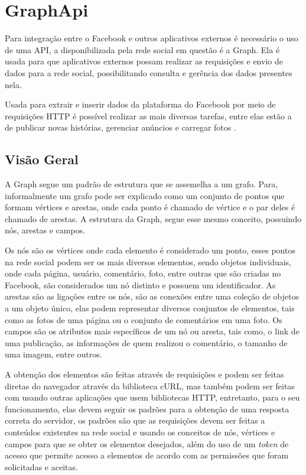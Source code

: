 \chapter[GraphApi]{GraphApi}
Para integração entre o Facebook e outros aplicativos externos é necessário o uso de uma API, a disponibilizada pela rede social em questão é a Graph. Ela é usada para que aplicativos externos possam realizar as requisições e envio de dados para a rede social, possibilitando consulta e gerência dos dados presentes nela. 

Usada para extrair e inserir dados da plataforma do Facebook por meio de requisições HTTP é possível realizar as mais diversas tarefas, entre elas estão a de publicar novas histórias, gerenciar anúncios e carregar fotos \cite{facebook2018b}.

\section{Visão Geral}
A Graph segue um padrão de estrutura que se assemelha a um grafo. Para\cite{soares2014}, informalmente um grafo pode ser explicado como um conjunto de pontos que formam vértices e arestas, onde cada ponto é chamado de vértice e o par deles é chamado de arestas. A estrutura da Graph, segue esse mesmo conceito, possuindo nós, arestas e campos. 

Os nós são os vértices onde cada elemento é considerado um ponto, esses pontos na rede social podem ser os mais diversos elementos, sendo objetos individuais, onde cada página, usuário, comentário, foto, entre outras que são criadas no Facebook, são considerados um nó distinto \cite{facebook2018b} e possuem um identificador. As arestas são as ligações entre os nós, são as conexões entre uma coleção de objetos a um objeto único, elas podem representar diversos conjuntos de elementos, tais como as fotos de uma página ou o conjunto de comentários em uma foto. Os campos são os atributos mais específicos de um nó ou aresta, tais como, o link de uma publicação, as informações de quem realizou o comentário, o tamanho de uma imagem, entre outros.

A obtenção dos elementos são feitas através de requisições e podem ser feitas diretas do navegador através da biblioteca cURL, mas também podem ser feitas com usando outras aplicações que usem bibliotecas HTTP, entretanto, para o seu funcionamento, elas devem seguir os padrões para a obtenção de uma resposta correta do servidor, os padrões são que as requisições devem ser feitas a conteúdos existentes na rede social e usando os conceitos de nós, vértices e campos para que se obter os elementos desejados, além do uso de um \textit{token} de acesso que permite acesso a elementos de acordo com as permissões que foram solicitadas e aceitas.

